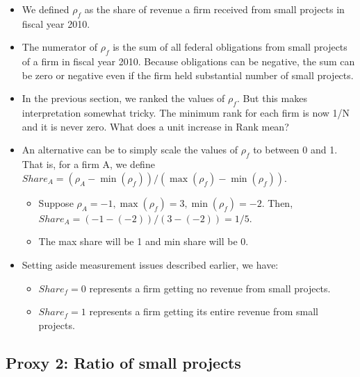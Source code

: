 \documentclass[
]{article}
\providecommand{\tightlist}{%
  \setlength{\itemsep}{0pt}\setlength{\parskip}{0pt}}
\begin{document}
\begin{itemize}
\tightlist
\item
  We defined \(\rho_f\) as the share of revenue a firm received from
  small projects in fiscal year 2010.
\item
  The numerator of \(\rho_f\) is the sum of all federal obligations from
  small projects of a firm in fiscal year 2010. Because obligations can
  be negative, the sum can be zero or negative even if the firm held
  substantial number of small projects.
\item
  In the previous section, we ranked the values of \(\rho_f\). But this
  makes interpretation somewhat tricky. The minimum rank for each firm
  is now 1/N and it is never zero. What does a unit increase in Rank
  mean?
\item
  An alternative can be to simply scale the values of \(\rho_f\) to
  between 0 and 1. That is, for a firm A, we define
  \(Share_A = (\rho_A - \min(\rho_f))/(\max(\rho_f)-\min(\rho_f))\).

  \begin{itemize}
  \tightlist
  \item
    Suppose \(\rho_A= -1,\max(\rho_f)=3,\min(\rho_f)=-2\). Then,
    \(Share_A = (-1-(-2))/(3-(-2))=1/5.\)
  \item
    The max share will be 1 and min share will be 0.
  \end{itemize}
\item
  Setting aside measurement issues described earlier, we have:

  \begin{itemize}
  \tightlist
  \item
    \(Share_f=0\) represents a firm getting no revenue from small
    projects.
  \item
    \(Share_f=1\) represents a firm getting its entire revenue from
    small projects.
  \end{itemize}
\end{itemize}

\hypertarget{proxy-2-ratio-of-small-projects}{%
\subsection{Proxy 2: Ratio of small
projects}\label{proxy-2-ratio-of-small-projects}}
\end{document}
